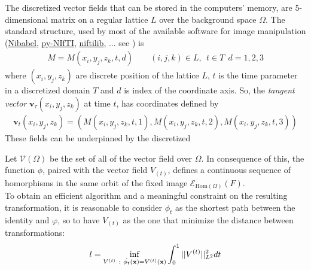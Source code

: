 The discretized vector fields that can be stored in the computers' memory, are 5-dimensional matrix on a regular lattice $L$ over the background space $\Omega$.
The standard structure, used by most of the available software for image manipulation (\href{http://nipy.org/nibabel/}{Nibabel}, \href{http://niftilib.sourceforge.net/pynifti/intro.html}{py-NIfTI}, \href{http://niftilib.sourceforge.net/}{niftilib}, ... see \cite{modersitzki2009fair}) is 
\begin{align}\label{eq:basic_data_structure}
M = M(x_i,y_j,z_k,t,d) \qquad (i,j,k)\in L , ~~ t \in T  ~~ d = 1,2,3
\end{align}
where $(x_i,y_j,z_k)$ are discrete position of the lattice $L$, $t$ is the time parameter in a discretized domain $T$ and $d$ is index of the coordinate axis. So, the \emph{tangent vector} $\mathbf{v}_{\tau}(x_i,y_j,z_k)$ at time $t$, has coordinates defined by
\begin{align*}
\mathbf{v}_{t}(x_i,y_j,z_k) = (M(x_i,y_j,z_k,t ,1), M(x_i,y_j,z_k,t,2), M(x_i,y_j,z_k,t ,3))
\end{align*}
These fields can be underpinned by the discretized 


Let $\mathcal{V}(\Omega)$ be the set of all of the vector field over $\Omega$.
In consequence of this, the function $\phi$, paired with the vector field $V_{(t)}$, defines a continuous sequence of homorphisms in the same orbit of the fixed image $\mathcal{E}_{\text{Hom}(\Omega)}(F)$. \\
To obtain an efficient algorithm and a meaningful constraint on the resulting transformation, it is reasonable to consider $\phi_{t}$ as the shortest path between the identity and $\varphi$, so to have $V_{(t)} $ as the one that minimize the distance between transformations:
\begin{align*}
	l = \inf_{V^{(t)} ~ : ~ \dot{\phi_{t}} (\mathbf{x}) = V^{(t)}(\mathbf{x} )}  \int_{0}^{1} \vert\lvert V^{(t)} \rvert\vert_{L^2}^{2}dt
\end{align*}





















